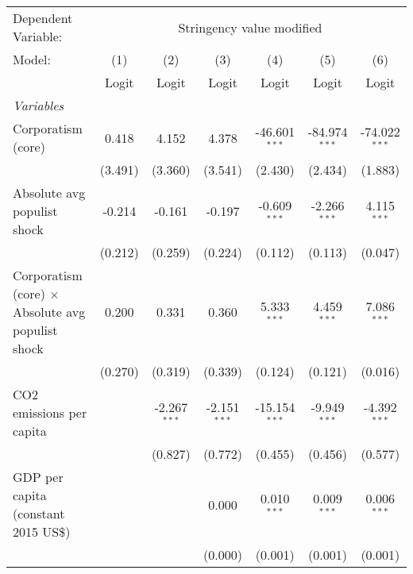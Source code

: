 
\begingroup
\centering
\begin{tabular}{lcccccc}
   \toprule
   Dependent Variable: & \multicolumn{6}{c}{Stringency value modified}\\
   Model:                                                   & (1)     & (2)            & (3)            & (4)             & (5)             & (6)\\  
                                                            &  Logit  & Logit          & Logit          & Logit           & Logit           & Logit\\  
   \midrule
   \emph{Variables}\\
   Corporatism (core)                                       & 0.418   & 4.152          & 4.378          & -46.601$^{***}$ & -84.974$^{***}$ & -74.022$^{***}$\\   
                                                            & (3.491) & (3.360)        & (3.541)        & (2.430)         & (2.434)         & (1.883)\\   
   Absolute avg populist shock                              & -0.214  & -0.161         & -0.197         & -0.609$^{***}$  & -2.266$^{***}$  & 4.115$^{***}$\\   
                                                            & (0.212) & (0.259)        & (0.224)        & (0.112)         & (0.113)         & (0.047)\\   
   Corporatism (core) $\times$ Absolute avg populist shock  & 0.200   & 0.331          & 0.360          & 5.333$^{***}$   & 4.459$^{***}$   & 7.086$^{***}$\\   
                                                            & (0.270) & (0.319)        & (0.339)        & (0.124)         & (0.121)         & (0.016)\\   
   CO2 emissions per capita                                 &         & -2.267$^{***}$ & -2.151$^{***}$ & -15.154$^{***}$ & -9.949$^{***}$  & -4.392$^{***}$\\   
                                                            &         & (0.827)        & (0.772)        & (0.455)         & (0.456)         & (0.577)\\   
   GDP per capita (constant 2015 US\$)                      &         &                & 0.000          & 0.010$^{***}$   & 0.009$^{***}$   & 0.006$^{***}$\\   
                                                            &         &                & (0.000)        & (0.001)         & (0.001)         & (0.001)\\   

\end{tabular}
